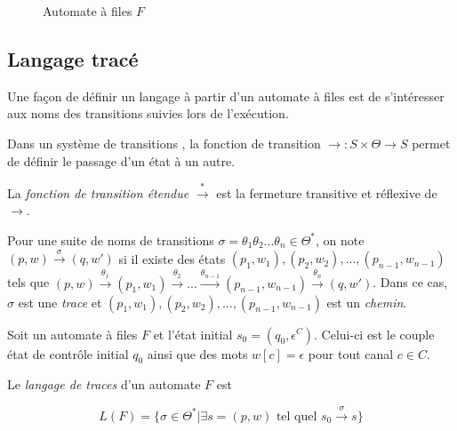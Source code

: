 \begin{example}
\begin{figure}[H]
    \caption{Automate à files $F$}\label{fig:st}
  \end{figure}


\end{example}




\subsection{Langage tracé}\label{ss:trace}

Une façon de définir un langage à partir d'un automate à files est de s'intéresser aux noms des transitions suivies lors de l'exécution.

Dans un système de transitions \tsys, la fonction de transition $\rightarrow:S\times\Theta\rightarrow S$ permet de définir le passage d'un état à un autre.

La \emph{fonction de transition étendue} $\xrightarrow{*}$ est la fermeture transitive et réflexive de $\rightarrow$.

Pour une suite de noms de transitions $\sigma=\theta_1\theta_2 ...\theta_n\in\Theta^*$, on note $(p,w)\xrightarrow{\sigma}(q,w')$ si il existe des états $(p_1,w_1),(p_2,w_2),...,(p_{n-1},w_{n-1})$ tels que $(p,w)\xrightarrow{\theta_1}(p_1,w_1)\xrightarrow{\theta_2}...\xrightarrow{\theta_{n-1}}(p_{n-1},w_{n-1})\xrightarrow{\theta_n}(q,w')$. Dans ce cas, $\sigma$ est une \emph{trace} et $(p_1,w_1),(p_2,w_2),...,(p_{n-1},w_{n-1})$ est un \emph{chemin}.

\begin{definition} Soit un automate à files $F$ et l'état initial $s_0=(q_0, \epsilon^C)$. Celui-ci est le couple état de contrôle initial $q_0$ ainsi que des mots $w[c]=\epsilon$ pour tout canal $c\in C$.

  Le \emph{langage de traces} d'un automate $F$ est

  $$
  L(F)=\{\sigma\in\Theta^*|\exists s=(p,w) \text{ tel quel } s_0\xrightarrow{\sigma}s\}
  $$
\end{definition}

